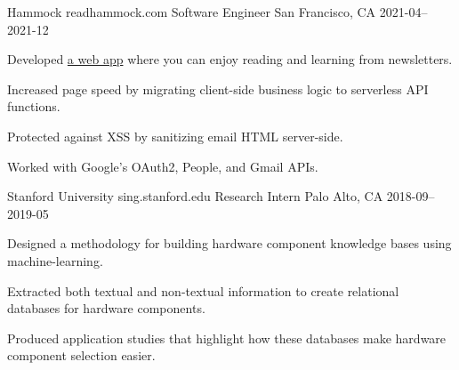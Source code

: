 \begin{cventries}
  \cventry
    {Hammock} %
    {readhammock.com} %
    {Software Engineer} %
    {San Francisco, CA} %
    {2021-04–2021-12} %
    {
      \begin{cvitems} %
        \item {Developed \href{https://github.com/nicholaschiang/hammock}{a web app} where you can enjoy reading and learning from newsletters.}
        \item {Increased page speed by migrating client-side business logic to serverless API functions.}
        \item {Protected against XSS by sanitizing email HTML server-side.}
        \item {Worked with Google's OAuth2, People, and Gmail APIs.}
      \end{cvitems}
    }

  \cventry
    {Stanford University} %
    {sing.stanford.edu} %
    {Research Intern} %
    {Palo Alto, CA} %
    {2018-09–2019-05} %
    {
      \begin{cvitems} %
        \item {Designed a methodology for building hardware component knowledge bases using machine-learning.}
        \item {Extracted both textual and non-textual information to create relational databases for hardware components.}
        \item {Produced application studies that highlight how these databases make hardware component selection easier.}
      \end{cvitems}
    }

\end{cventries}
